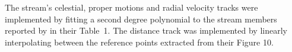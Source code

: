 The stream's celestial, proper motions and radial velocity tracks were implemented by fitting a second degree polynomial to the stream members reported by \citet{Yang2023} in their Table~1. The distance track was implemented by linearly interpolating between the reference points extracted from their Figure 10.
